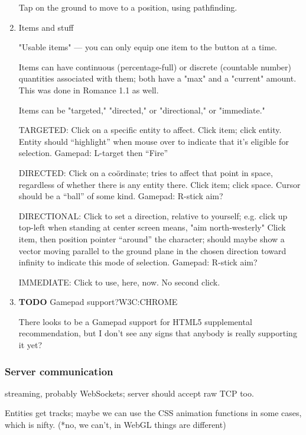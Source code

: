 \documentclass[11pt]{article}
\begin{document}
\begin{enumerate}
Tap on the ground to move to a position, using pathfinding.
\item Items and stuff
\label{sec-1-5-2-2}

"Usable  items" ---  you can  only  equip one  item to  the button  at
a time.

Items  can have  continuous (percentage-full)  or discrete  (countable
number)  quantities associated  with them;  both  have a  "max" and  a
"current" amount. This was done in Romance 1.1 as well.

Items can be "targeted," "directed," or "directional," or "immediate."

TARGETED:  Click  on   a  specific  entity  to   affect.  Click  item;
click entity.  Entity should “highlight”  when mouse over  to indicate
that it's eligible for selection. Gamepad: L-target then “Fire”

DIRECTED: Click on a coördinate; tries  to affect that point in space,
regardless  of  whether  there  is   any  entity  there.  Click  item;
click  space.  Cursor  should  be  a “ball”  of  some  kind.  Gamepad:
R-stick aim? 

DIRECTIONAL:  Click   to  set  a  direction,   relative  to  yourself;
e.g.  click up  top-left when  standing at  center screen  means, "aim
north-westerly"  Click  item,  then   position  pointer  “around”  the
character; should  maybe show a  vector moving parallel to  the ground
plane in  the chosen direction  toward infinity to indicate  this mode
of selection. Gamepad: R-stick aim?

IMMEDIATE: Click to use, here, now. No second click.
\item {\bfseries\sffamily TODO} Gamepad support?\hfill{}\textsc{W3C:CHROME}
\label{sec-1-5-2-3}

There  looks   to  be  a   Gamepad  support  for   HTML5  supplemental
recommendation,  but I  don't see  any  signs that  anybody is  really
supporting it yet?
\end{enumerate}
\subsubsection{Server communication}
\label{sec-1-5-3}

streaming, probably WebSockets; server should accept raw TCP too.

Entities get tracks;  maybe we can use the CSS  animation functions in
some  cases, which  is  nifty. (*no,  we can't,  in  WebGL things  are
different)
\end{document}
